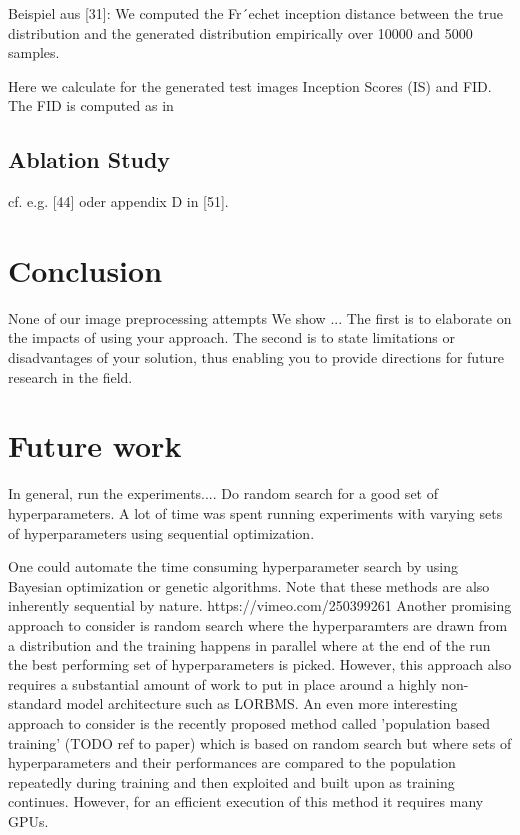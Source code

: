 \documentclass[11pt,a4paper]{article}
\begin{document}
Beispiel aus [31]: We computed the Fr´echet inception distance between the true distribution and the generated
distribution empirically over 10000 and 5000 samples.

Here we calculate for the generated test images Inception Scores (IS) and FID. The FID is computed as in 


\subsection{Ablation Study}
cf. e.g. [44] oder appendix D in [51].

\section{Conclusion}
None of our image preprocessing attempts
We show ...
The first is
to elaborate on the impacts of using your approach. The
second is to state limitations or disadvantages of your solution,
thus enabling you to provide directions for future
research in the field.

\section{Future work}
In general, run the experiments.... Do random search for a good set of hyperparameters. A lot of time was spent running experiments with varying sets of hyperparameters using sequential optimization.

\par One could automate the time consuming hyperparameter search by using Bayesian optimization or genetic algorithms. Note that these methods are also inherently sequential by nature. https://vimeo.com/250399261
Another promising approach to consider is random search where the hyperparamters are drawn from a distribution and the training happens in parallel where at the end of the run the best performing set of hyperparameters is picked. However, this approach also requires a substantial amount of work to put in place around a highly non-standard model architecture such as LORBMS. An even more interesting approach to consider is the recently proposed method called 'population based training' (TODO ref to paper) which is based on random search but where sets of hyperparameters and their performances are compared to the population repeatedly during training and then exploited and built upon as training continues. However, for an efficient execution of this method it requires many GPUs. 
\end{document}
